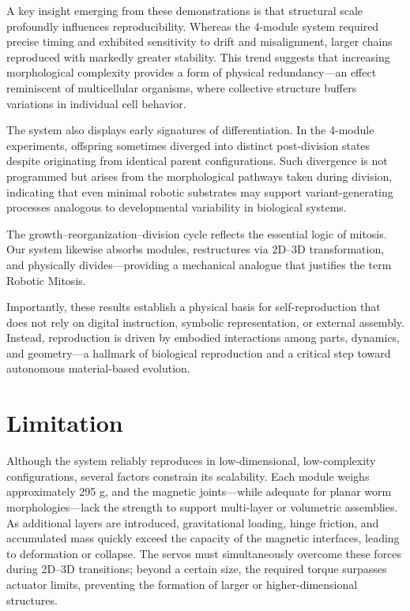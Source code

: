 \documentclass[lettersize,journal]{IEEEtran}
\begin{document}
A key insight emerging from these demonstrations is that structural scale profoundly influences reproducibility. Whereas the 4-module system required precise timing and exhibited sensitivity to drift and misalignment, larger chains reproduced with markedly greater stability. This trend suggests that increasing morphological complexity provides a form of physical redundancy—an effect reminiscent of multicellular organisms, where collective structure buffers variations in individual cell behavior.

The system also displays early signatures of differentiation. In the 4-module experiments, offspring sometimes diverged into distinct post-division states despite originating from identical parent configurations. Such divergence is not programmed but arises from the morphological pathways taken during division, indicating that even minimal robotic substrates may support variant-generating processes analogous to developmental variability in biological systems.

The growth–reorganization–division cycle reflects the essential logic of mitosis. Our system likewise absorbs modules, restructures via 2D–3D transformation, and physically divides—providing a mechanical analogue that justifies the term Robotic Mitosis.

Importantly, these results establish a physical basis for self-reproduction that does not rely on digital instruction, symbolic representation, or external assembly. Instead, reproduction is driven by embodied interactions among parts, dynamics, and geometry—a hallmark of biological reproduction and a critical step toward autonomous material-based evolution.

\section{Limitation}

Although the system reliably reproduces in low-dimensional, low-complexity configurations, several factors constrain its scalability. Each module weighs approximately 295 g, and the magnetic joints—while adequate for planar worm morphologies—lack the strength to support multi-layer or volumetric assemblies. As additional layers are introduced, gravitational loading, hinge friction, and accumulated mass quickly exceed the capacity of the magnetic interfaces, leading to deformation or collapse. The servos must simultaneously overcome these forces during 2D–3D transitions; beyond a certain size, the required torque surpasses actuator limits, preventing the formation of larger or higher-dimensional structures.
\end{document}
